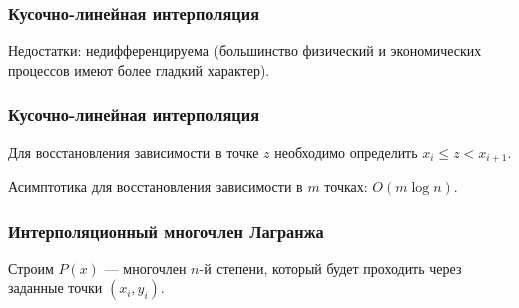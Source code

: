 \documentclass[10pt]{beamer}
\begin{document}
\begin{frame}[fragile]
\frametitle{Кусочно-линейная интерполяция}

Недостатки: недифференцируема (большинство физический и экономических процессов имеют более гладкий характер).

\end{frame}



\begin{frame}[fragile]
\frametitle{Кусочно-линейная интерполяция}

Для восстановления зависимости в точке $z$ необходимо определить $x_i \leqslant z < x_{i+1}$. 

\vfill

Асимптотика для восстановления зависимости в $m$ точках: $O(m \log{n})$. 


\end{frame}

\begin{frame}[fragile]
\frametitle{Интерполяционный многочлен Лагранжа}

Строим $P(x)$ --- многочлен $n$-й степени, который будет проходить через заданные точки $(x_i, y_i)$.


\begin{center}
\end{center}
\end{frame}
\end{document}
